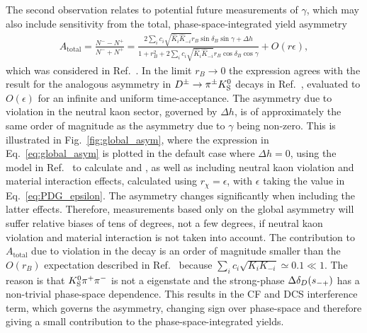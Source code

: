 
The second observation relates to potential future measurements of $\gamma$, which may also include sensitivity from the total, phase-space-integrated yield asymmetry
\begin{align}\label{eq:global_asym}
    A_\text{total}=\frac{N^--N^+}{N^-+N^+} = 
    \frac{ 2\sum_{i} c_i\sqrt{\hat K_i\hat K_{-i}} r_B \sin \delta_B \sin \gamma +\Delta h}
    {1 + r_B^2+ 2\sum_ic_i\sqrt{\hat K_i\hat K_{-i}} r_B \cos \delta_B \cos \gamma} + O(r\epsilon),
\end{align}
which was considered in Ref.~\cite{YuvalKsCPV}. In the limit $r_B\to 0$ the expression agrees with the result for the analogous asymmetry in ${{D}^\pm}\rightarrow{\ensuremath{{\pi}^\pm}}{\ensuremath{{K}^0_{\mathrm{S}}}}$ decays in Ref.~\cite{Grossman2012}, evaluated to $O(\epsilon)$ for an infinite and uniform time-acceptance. The asymmetry due to \CP violation in the neutral kaon sector, governed by $\Delta h$, is of approximately the same order of magnitude as the asymmetry due to $\gamma$ being non-zero. This is illustrated in Fig.~\ref{fig:global_asym}, where the expression in Eq.~\eqref{eq:global_asym} is plotted in the default case where $\Delta h=0$, using the model in Ref.~\cite{DalitzModel18} to calculate \Ki and \ci, as well as including neutral kaon \CP violation and material interaction effects, calculated using $r_\chi=\epsilon$, with $\epsilon$ taking the value in Eq.~\eqref{eq:PDG_epsilon}. The asymmetry changes significantly when including the latter effects. Therefore, measurements based only on the global asymmetry will suffer relative biases of tens of degrees, not a few degrees, if neutral kaon \CP violation and material interaction is not taken into account. The contribution to $A_\text{total}$ due to \CP violation in the \B decay is an order of magnitude smaller than the $O(r_B)$ expectation described in Ref.~\cite{YuvalKsCPV} because $\sum_ic_i\sqrt{K_iK_{-i}}\simeq 0.1 \ll 1$. The reason is that ${{K}^0_{\mathrm{S}}}{{\pi}^+}{{\pi}^-}$ is not a \CP eigenstate and the strong-phase $\Delta\delta_D(s_{-+})$ has a non-trivial phase-space dependence. This results in the CF and DCS interference term, which governs the \CP asymmetry, changing sign over phase-space and therefore giving a small contribution to the phase-space-integrated yields.


